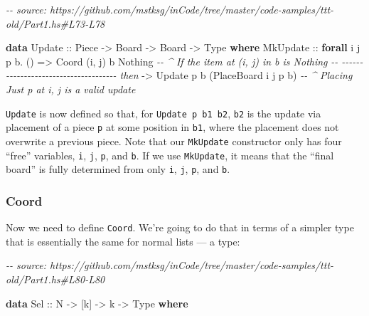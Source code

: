 \documentclass[]{article}
\newenvironment{Shaded}{}{}
\newcommand{\CommentTok}[1]{\textcolor[rgb]{0.38,0.63,0.69}{\textit{#1}}}
\newcommand{\DataTypeTok}[1]{\textcolor[rgb]{0.56,0.13,0.00}{#1}}
\newcommand{\KeywordTok}[1]{\textcolor[rgb]{0.00,0.44,0.13}{\textbf{#1}}}
\newcommand{\NormalTok}[1]{#1}
\newcommand{\OperatorTok}[1]{\textcolor[rgb]{0.40,0.40,0.40}{#1}}
\newcommand{\OtherTok}[1]{\textcolor[rgb]{0.00,0.44,0.13}{#1}}
\begin{document}
\begin{Shaded}
\begin{Highlighting}[]
\CommentTok{{-}{-} source: https://github.com/mstksg/inCode/tree/master/code{-}samples/ttt{-}old/Part1.hs\#L73{-}L78}

\KeywordTok{data} \DataTypeTok{Update}\OtherTok{ ::} \DataTypeTok{Piece} \OtherTok{{-}\textgreater{}} \DataTypeTok{Board} \OtherTok{{-}\textgreater{}} \DataTypeTok{Board} \OtherTok{{-}\textgreater{}} \DataTypeTok{Type} \KeywordTok{where}
    \DataTypeTok{MkUpdate}
\OtherTok{        ::} \KeywordTok{forall}\NormalTok{ i j p b}\OperatorTok{.}\NormalTok{ ()}
        \OtherTok{=\textgreater{}} \DataTypeTok{Coord}\NormalTok{ \textquotesingle{}(i, j) b }\DataTypeTok{\textquotesingle{}Nothing}         \CommentTok{{-}{-} \^{} If the item at (i, j) in b is Nothing}
        \CommentTok{{-}{-} {-}{-}{-}{-}{-}{-}{-}{-}{-}{-}{-}{-}{-}{-}{-}{-}{-}{-}{-}{-}{-}{-}{-}{-}{-}{-}{-}{-}{-}{-}{-}{-}{-}{-}{-}{-}{-} then}
        \OtherTok{{-}\textgreater{}} \DataTypeTok{Update}\NormalTok{ p b (}\DataTypeTok{PlaceBoard}\NormalTok{ i j p b)  }\CommentTok{{-}{-} \^{} Placing \textasciigrave{}Just p\textasciigrave{} at i, j is a valid update}
\end{Highlighting}
\end{Shaded}

\texttt{Update} is now defined so that, for \texttt{Update\ p\ b1\ b2},
\texttt{b2} is the update via placement of a piece \texttt{p} at some position
in \texttt{b1}, where the placement does not overwrite a previous piece. Note
that our \texttt{MkUpdate} constructor only has four ``free'' variables,
\texttt{i}, \texttt{j}, \texttt{p}, and \texttt{b}. If we use \texttt{MkUpdate},
it means that the ``final board'' is fully determined from only \texttt{i},
\texttt{j}, \texttt{p}, and \texttt{b}.

\subsubsection{Coord}\label{coord}

Now we need to define \texttt{Coord}. We're going to do that in terms of a
simpler type that is essentially the same for normal lists --- a type:

\begin{Shaded}
\begin{Highlighting}[]
\CommentTok{{-}{-} source: https://github.com/mstksg/inCode/tree/master/code{-}samples/ttt{-}old/Part1.hs\#L80{-}L80}

\KeywordTok{data} \DataTypeTok{Sel}\OtherTok{ ::} \DataTypeTok{N} \OtherTok{{-}\textgreater{}}\NormalTok{ [k] }\OtherTok{{-}\textgreater{}}\NormalTok{ k }\OtherTok{{-}\textgreater{}} \DataTypeTok{Type} \KeywordTok{where}
\end{Highlighting}
\end{Shaded}
\end{document}
